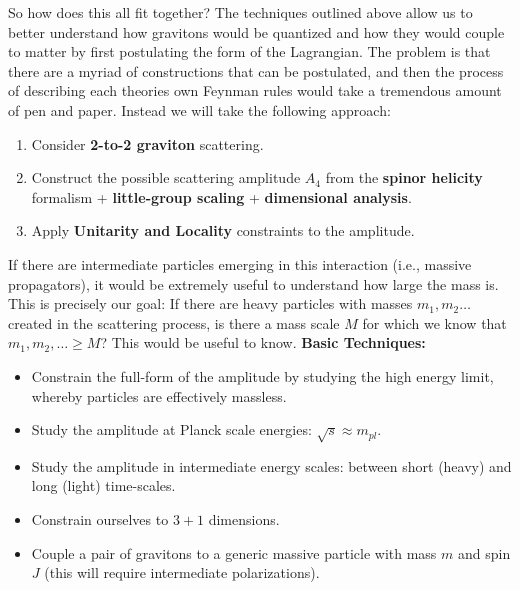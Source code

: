 \documentclass[11pt,a4paper]{article}
\begin{document}
So how does this all fit together?  The techniques outlined above allow us to better understand how gravitons would be quantized and how they would couple to matter by first postulating the form of the Lagrangian.  The problem is that there are a myriad of constructions that can be postulated, and then the process of describing each theories own Feynman rules would take a tremendous amount of pen and paper.   Instead we will take the following approach:
\begin{enumerate}
	\item Consider \textbf{2-to-2 graviton} scattering.
	\item Construct the possible scattering amplitude $A_4$ from the \textbf{spinor helicity} formalism + \textbf{little-group scaling} + \textbf{dimensional analysis}.
	\item Apply \textbf{Unitarity and Locality} constraints to the amplitude.
\end{enumerate}
If there are intermediate particles emerging in this interaction (i.e., massive propagators), it would be extremely useful to understand how large the mass is.  This is precisely our goal: If there are heavy particles with masses $m_1, m_2 \dots $ created in the scattering process, is there a mass scale $M$ for which we know that $m_1, m_2, \dots  \geq M$?  This would be useful to know.
\textbf{Basic Techniques:}
\begin{itemize}
	\item Constrain the full-form of the amplitude by studying the high energy limit, whereby particles are effectively massless.
	\item Study the amplitude at Planck scale energies: $\sqrt{s} \approx m_{pl}$.
	\item Study the amplitude in intermediate energy scales: between short (heavy) and long (light) time-scales.
	\item Constrain ourselves to $3 + 1$ dimensions.
	\item Couple a pair of gravitons to a generic massive particle with mass $m$ and spin $J$ (this will require intermediate polarizations).
\end{itemize}
\end{document}
